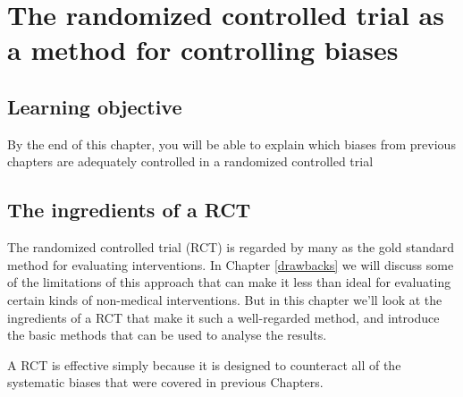 \documentclass{krantz}
\begin{document}
\hypertarget{RCT}{%
\chapter{The randomized controlled trial as a method for controlling biases}\label{RCT}}

\hypertarget{learning-objective}{%
\section{Learning objective}\label{learning-objective}}

By the end of this chapter, you will be able to explain which biases from previous chapters are adequately controlled in a randomized controlled trial

\hypertarget{the-ingredients-of-a-rct}{%
\section{The ingredients of a RCT}\label{the-ingredients-of-a-rct}}

The randomized controlled trial (RCT) is regarded by many as the gold standard method for evaluating interventions. In Chapter \ref{drawbacks} we will discuss some of the limitations of this approach that can make it less than ideal for evaluating certain kinds of non-medical interventions. But in this chapter we'll look at the ingredients of a RCT that make it such a well-regarded method, and introduce the basic methods that can be used to analyse the results.

A RCT is effective simply because it is designed to counteract all of the systematic biases that were covered in previous Chapters.
\end{document}
